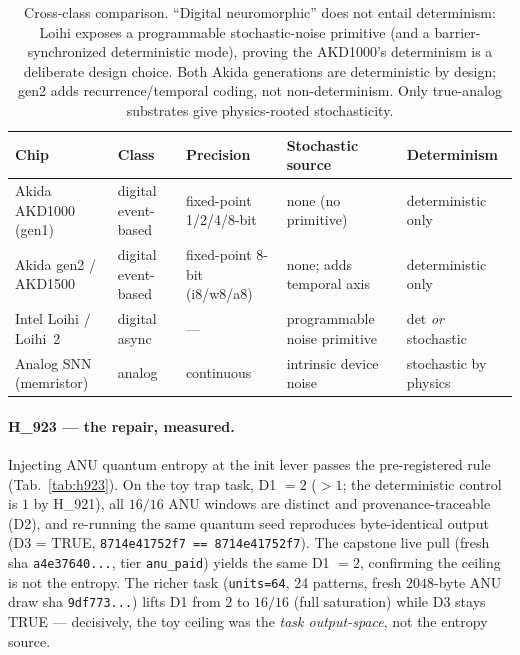 \documentclass[11pt,a4paper]{article}
\begin{document}
\begin{table}[h]
\centering
\small
\begin{tabular}{@{}lllll@{}}
\toprule
\textbf{Chip} & \textbf{Class} & \textbf{Precision} & \textbf{Stochastic source} & \textbf{Determinism} \\
\midrule
Akida AKD1000 (gen1) & digital event-based & fixed-point 1/2/4/8-bit & none (no primitive) & deterministic only \\
Akida gen2 / AKD1500 & digital event-based & fixed-point 8-bit (i8/w8/a8) & none; adds temporal axis & deterministic only \\
Intel Loihi / Loihi~2 & digital async & --- & programmable noise primitive & det \emph{or} stochastic \\
Analog SNN (memristor) & analog & continuous & intrinsic device noise & stochastic by physics \\
\bottomrule
\end{tabular}
\caption{Cross-class comparison. ``Digital neuromorphic'' does not entail
determinism: Loihi exposes a programmable stochastic-noise primitive (and a
barrier-synchronized deterministic mode), proving the AKD1000's determinism
is a deliberate design choice. Both Akida generations are deterministic by
design; gen2 adds recurrence/temporal coding, not non-determinism. Only
true-analog substrates give physics-rooted stochasticity.}
\label{tab:compare}
\end{table}

\paragraph{H\_923 --- the repair, measured.} Injecting ANU quantum entropy
at the init lever passes the pre-registered rule (Tab.~\ref{tab:h923}). On
the toy trap task, D1 \(=2\) (\(>1\); the deterministic control is \(1\) by
H\_921), all \(16/16\) ANU windows are distinct and provenance-traceable
(D2), and re-running the same quantum seed reproduces byte-identical output
(D3 = TRUE, \texttt{8714e41752f7 == 8714e41752f7}). The capstone live pull
(fresh sha \texttt{a4e37640...}, tier \texttt{anu\_paid}) yields the same
D1 \(=2\), confirming the ceiling is not the entropy. The richer task
(\texttt{units=64}, 24 patterns, fresh \(2048\)-byte ANU draw sha
\texttt{9df773...}) lifts D1 from \(2\) to \(16/16\) (full saturation)
while D3 stays TRUE --- decisively, the toy ceiling was the \emph{task
output-space}, not the entropy source.
\end{document}
